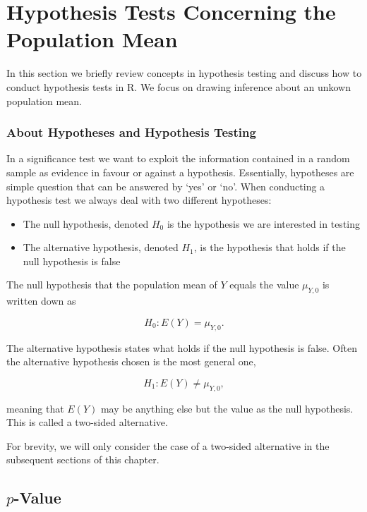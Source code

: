 \documentclass[]{book}
\theoremstyle{definition}
\theoremstyle{definition}
\theoremstyle{definition}
\theoremstyle{remark}
\begin{document}
\section{Hypothesis Tests Concerning the Population
Mean}\label{hypothesis-tests-concerning-the-population-mean}

In this section we briefly review concepts in hypothesis testing and
discuss how to conduct hypothesis tests in R. We focus on drawing
inference about an unkown population mean.

\subsubsection*{About Hypotheses and Hypothesis
Testing}\label{about-hypotheses-and-hypothesis-testing}

In a significance test we want to exploit the information contained in a
random sample as evidence in favour or against a hypothesis.
Essentially, hypotheses are simple question that can be answered by
`yes' or `no'. When conducting a hypothesis test we always deal with two
different hypotheses:

\begin{itemize}
\item
  The null hypothesis, denoted \(H_0\) is the hypothesis we are
  interested in testing
\item
  The alternative hypothesis, denoted \(H_1\), is the hypothesis that
  holds if the null hypothesis is false
\end{itemize}

The null hypothesis that the population mean of \(Y\) equals the value
\(\mu_{Y,0}\) is written down as

\[ H_0: E(Y) = \mu_{Y,0}. \]

The alternative hypothesis states what holds if the null hypothesis is
false. Often the alternative hypothesis chosen is the most general one,

\[ H_1: E(Y) \neq \mu_{Y,0}, \]

meaning that \(E(Y)\) may be anything else but the value as the null
hypothesis. This is called a two-sided alternative.

For brevity, we will only consider the case of a two-sided alternative
in the subsequent sections of this chapter.

\subsection*{\texorpdfstring{\(p\)-Value}{p-Value}}\label{p-value}
\end{document}
